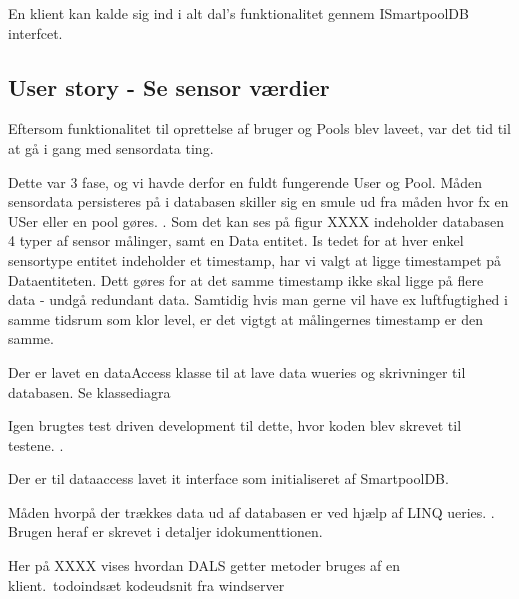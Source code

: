 En klient kan kalde sig ind i alt dal's funktionalitet gennem ISmartpoolDB interfcet.



\subsection{User story - Se sensor værdier}

Eftersom funktionalitet til oprettelse af bruger og Pools blev laveet, var  det tid til at gå i gang med sensordata ting.

Dette var 3 fase, og vi havde derfor en fuldt fungerende User og Pool. Måden sensordata persisteres på i databasen skiller sig en smule ud fra måden hvor fx en USer eller en pool gøres. . Som det kan ses på figur XXXX indeholder databasen 4 typer af sensor målinger, samt en Data entitet. Is tedet for at hver enkel sensortype entitet indeholder et timestamp, har vi valgt at ligge timestampet på Dataentiteten. Dett gøres for at det samme timestamp ikke skal ligge på flere data - undgå redundant data.  Samtidig hvis man gerne vil have ex luftfugtighed i samme tidsrum som klor level, er det vigtgt at målingernes timestamp er den samme.

Der er lavet en dataAccess klasse til at lave data wueries og skrivninger til databasen. Se klassediagra 

Igen brugtes test driven development til dette, hvor koden blev skrevet til testene.  .

Der er til dataaccess lavet it interface som initialiseret af SmartpoolDB.

Måden hvorpå der trækkes data ud af databasen er ved hjælp af LINQ ueries. . Brugen heraf er skrevet i detaljer idokumenttionen.

Her på XXXX vises hvordan DALS getter metoder bruges af en klient.\ todo{indsæt kodeudsnit fra windserver}